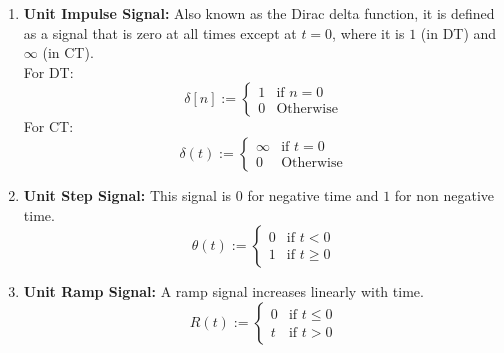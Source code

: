\begin{enumerate}
    \item \textbf{Unit Impulse Signal:} Also known as the Dirac delta function, it is defined as a signal
that is zero at all times except at $t=0$, where it is $1$ (in DT) and $\infty$ (in CT).\\
    For DT:
    \[\delta[n] := \begin{cases}
        1 & \text{if } n = 0\\
        0 & \text{Otherwise}
    \end{cases}\]
    For CT:
    \[\delta(t) := \begin{cases}
        \infty & \text{if } t = 0\\
        0 & \text{Otherwise}
    \end{cases}\]


    \item \textbf{Unit Step Signal:} This signal is $0$ for negative time and $1$ for non negative time.
    \[\theta(t) := \begin{cases}
        0 & \text{if }t < 0\\
        1 & \text{if }t \geq 0
    \end{cases}\]

    \item \textbf{Unit Ramp Signal:} A ramp signal increases linearly with time.
    \[R(t) := \begin{cases}
        0 & \text{if } t \leq 0\\
        t & \text{if } t > 0 
    \end{cases}\]


\end{enumerate}
